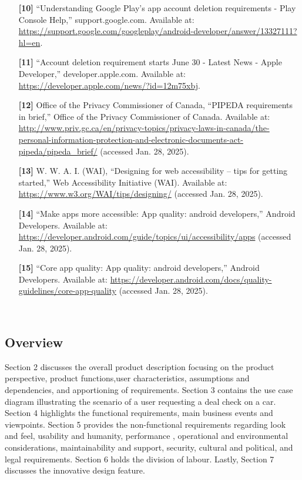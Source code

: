 \documentclass[]{article}
\begin{document}
\begin{enumerate}
    \item [\textbf{[10]}] “Understanding Google Play’s app account deletion requirements - Play Console Help,” support.google.com. Available at: \url{https://support.google.com/googleplay/android-developer/answer/13327111?hl=en}.
    
    \item [\textbf{[11]}] “Account deletion requirement starts June 30 - Latest News - Apple Developer,” developer.apple.com. Available at: \url{https://developer.apple.com/news/?id=12m75xbj}.
    
    \item [\textbf{[12]}] Office of the Privacy Commissioner of Canada, “PIPEDA requirements in brief,” Office of the Privacy Commissioner of Canada. Available at: \url{http://www.priv.gc.ca/en/privacy-topics/privacy-laws-in-canada/the-personal-information-protection-and-electronic-documents-act-pipeda/pipeda_brief/} (accessed Jan. 28, 2025).
    
    \item [\textbf{[13]}] W. W. A. I. (WAI), “Designing for web accessibility – tips for getting started,” Web Accessibility Initiative (WAI). Available at: \url{https://www.w3.org/WAI/tips/designing/} (accessed Jan. 28, 2025).
    
    \item [\textbf{[14]}] “Make apps more accessible: App quality: android developers,” Android Developers. Available at: \url{https://developer.android.com/guide/topics/ui/accessibility/apps} (accessed Jan. 28, 2025).
    
    \item [\textbf{[15]}] “Core app quality: App quality: android developers,” Android Developers. Available at: \url{https://developer.android.com/docs/quality-guidelines/core-app-quality} (accessed Jan. 28, 2025).
    
    
‌
\end{enumerate}

\subsection{Overview}
\label{sub:overview}
Section 2 discusses the overall product description focusing on the product perspective, product functions,user characteristics, assumptions and dependencies, and apportioning of requirements. Section 3 contains the use case diagram illustrating the scenario of a user requesting a deal check on a car. Section 4 highlights the functional requirements, main business events and viewpoints. Section 5 provides the non-functional requirements regarding look and feel, usability and humanity, performance , operational and environmental considerations, maintainability and support, security, cultural and political, and legal requirements. Section 6 holds the division of labour. Lastly, Section 7 discusses the innovative design feature.
\end{document}
